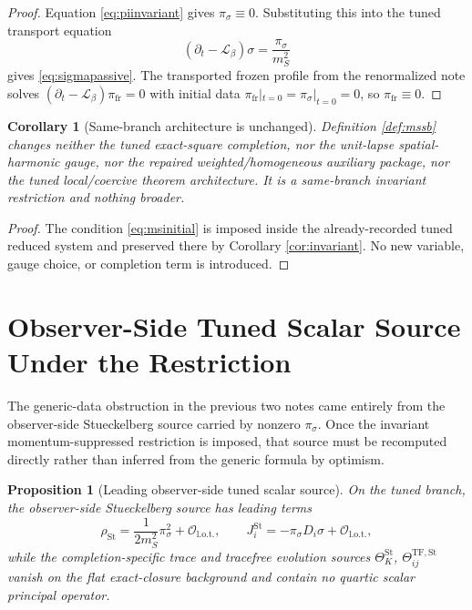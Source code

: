 \documentclass[11pt]{article}
\newcommand{\Ell}{\mathcal{L}}
\newtheorem{proposition}{Proposition}
\newtheorem{corollary}{Corollary}
\begin{document}
\begin{proof}
Equation \eqref{eq:piinvariant} gives \(\pi_\sigma\equiv 0\). Substituting this into the tuned transport equation
\[
(\partial_t-\Ell_\beta)\sigma=\frac{\pi_\sigma}{m_S^2}
\]
gives \eqref{eq:sigmapassive}. The transported frozen profile from the renormalized note solves \((\partial_t-\Ell_\beta)\pi_{\mathrm{fr}}=0\) with initial data \(\pi_{\mathrm{fr}}|_{t=0}=\pi_\sigma|_{t=0}=0\), so \(\pi_{\mathrm{fr}}\equiv 0\).
\end{proof}

\begin{corollary}[Same-branch architecture is unchanged]
\label{cor:samebranch}
Definition \ref{def:mssb} changes neither the tuned exact-square completion, nor the unit-lapse spatial-harmonic gauge, nor the repaired weighted/homogeneous auxiliary package, nor the tuned local/coercive theorem architecture. It is a same-branch invariant restriction and nothing broader.
\end{corollary}

\begin{proof}
The condition \eqref{eq:msinitial} is imposed inside the already-recorded tuned reduced system and preserved there by Corollary \ref{cor:invariant}. No new variable, gauge choice, or completion term is introduced.
\end{proof}

\section{Observer-Side Tuned Scalar Source Under the Restriction}

The generic-data obstruction in the previous two notes came entirely from the observer-side Stueckelberg source carried by nonzero \(\pi_\sigma\). Once the invariant momentum-suppressed restriction is imposed, that source must be recomputed directly rather than inferred from the generic formula by optimism.

\begin{proposition}[Leading observer-side tuned scalar source]
\label{prop:leading}
On the tuned branch, the observer-side Stueckelberg source has leading terms
\begin{equation}
\rho_{\mathrm{St}}
=
\frac{1}{2m_S^2}\pi_\sigma^2+\mathcal O_{\mathrm{l.o.t.}},
\qquad
J_i^{\mathrm{St}}
=
-\pi_\sigma D_i\sigma+\mathcal O_{\mathrm{l.o.t.}},
\label{eq:leading}
\end{equation}
while the completion-specific trace and tracefree evolution sources \(\Theta_K^{\mathrm{St}}\), \(\Theta_{ij}^{\mathrm{TF,St}}\) vanish on the flat exact-closure background and contain no quartic scalar principal operator.
\end{proposition}
\end{document}
